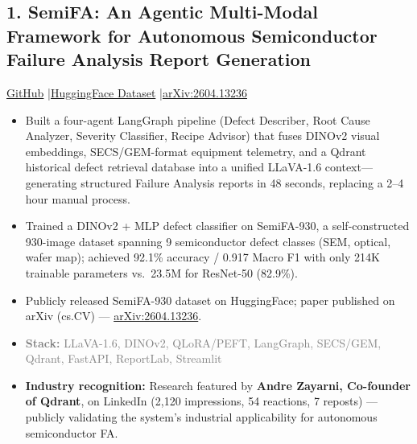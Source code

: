 \documentclass[11pt,a4paper]{article}
\newcommand{\projectstack}[1]{\textcolor{graytext}{\textbf{Stack:} #1}}
\begin{document}
\subsection{1. SemiFA: An Agentic Multi-Modal Framework for Autonomous Semiconductor Failure Analysis Report Generation}
{\small \href{https://github.com/Shivamckaushik/SemiFA}{GitHub} \enspace|\enspace \href{https://huggingface.co/datasets/ShivamChand/SemiFA-930}{HuggingFace Dataset} \enspace|\enspace \href{https://arxiv.org/abs/2604.13236}{arXiv:2604.13236}}
\begin{itemize}[leftmargin=*, nosep, topsep=3pt]
    \item Built a four-agent LangGraph pipeline (Defect Describer, Root Cause Analyzer, Severity Classifier, Recipe Advisor) that fuses DINOv2 visual embeddings, SECS/GEM-format equipment telemetry, and a Qdrant historical defect retrieval database into a unified LLaVA-1.6 context---generating structured Failure Analysis reports in 48 seconds, replacing a 2--4 hour manual process.
    \item Trained a DINOv2 + MLP defect classifier on SemiFA-930, a self-constructed 930-image dataset spanning 9 semiconductor defect classes (SEM, optical, wafer map); achieved 92.1\% accuracy / 0.917 Macro F1 with only 214K trainable parameters vs.\ 23.5M for ResNet-50 (82.9\%).
    \item Publicly released SemiFA-930 dataset on HuggingFace; paper published on arXiv (cs.CV) --- \href{https://arxiv.org/abs/2604.13236}{arXiv:2604.13236}.
    \item \projectstack{LLaVA-1.6, DINOv2, QLoRA/PEFT, LangGraph, SECS/GEM, Qdrant, FastAPI, ReportLab, Streamlit}
    \item \textbf{Industry recognition:} Research featured by \textbf{Andre Zayarni, Co-founder of Qdrant}, on LinkedIn (2,120 impressions, 54 reactions, 7 reposts) --- publicly validating the system's industrial applicability for autonomous semiconductor FA.
\end{itemize}
\end{document}
